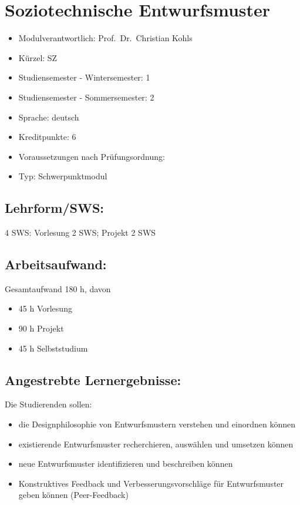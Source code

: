 \chapter{Soziotechnische
Entwurfsmuster}\label{soziotechnische-entwurfsmuster}

\begin{itemize}
\tightlist
\item
  Modulverantwortlich: Prof.~Dr.~Christian Kohls
\item
  Kürzel: SZ
\item
  Studiensemester - Wintersemester: 1
\item
  Studiensemester - Sommersemester: 2
\item
  Sprache: deutsch
\item
  Kreditpunkte: 6
\item
  Voraussetzungen nach Prüfungsordnung:
\item
  Typ: Schwerpunktmodul
\end{itemize}

\section*{Lehrform/SWS:}\label{lehrformsws-12}

4 SWS: Vorlesung 2 SWS; Projekt 2 SWS

\section*{Arbeitsaufwand:}\label{arbeitsaufwand-18}

Gesamtaufwand 180 h, davon

\begin{itemize}
\tightlist
\item
  45 h Vorlesung
\item
  90 h Projekt
\item
  45 h Selbststudium
\end{itemize}

\section*{Angestrebte
Lernergebnisse:}\label{angestrebte-lernergebnisse-12}

Die Studierenden sollen:

\begin{itemize}
\tightlist
\item
  die Designphilosophie von Entwurfsmustern verstehen und einordnen
  können
\item
  existierende Entwurfsmuster recherchieren, auswählen und umsetzen
  können
\item
  neue Entwurfsmuster identifizieren und beschreiben können
\item
  Konstruktives Feedback und Verbesserungsvorschläge für Entwurfsmuster
  geben können (Peer-Feedback)
\end{itemize}

